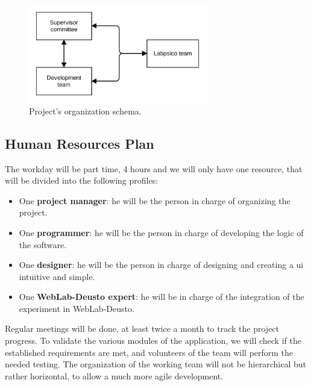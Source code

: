 \begin{figure}[ht]
	\centering
	\includegraphics[width=0.7\textwidth]{fig/organization}
	\caption{Project's organization schema.}\label{fig:org}
\end{figure}

\subsection{Human Resources Plan}

The workday will be part time, 4 hours and we will only have one resource, that will be divided into
the following profiles:

\begin{itemize}
\item One \textbf{project manager}: he will be the person in charge of organizing the project.

\item One \textbf{programmer}: he will be the person in charge of developing the logic of the
software.

\item One \textbf{designer}: he will be the person in charge of designing and creating a
\acrlong{ui} intuitive and simple.

\item One \textbf{WebLab-Deusto expert}: he will be in charge of the integration of the experiment
in WebLab-Deusto.
\end{itemize}

Regular meetings will be done, at least twice a month to track the project progress. To validate the
various modules of the application, we will check if the established requirements are met, and
volunteers of the team will perform the needed testing. The organization of the working team will
not be hierarchical but rather horizontal, to allow a much more agile development.
